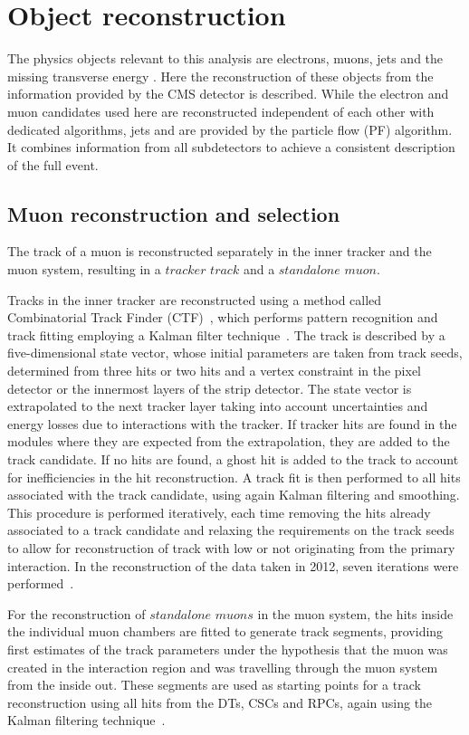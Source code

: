 \section{Object reconstruction}
The physics objects relevant to this analysis are electrons, muons, jets and the missing transverse energy \MET. Here the reconstruction of these objects from the information provided by the CMS detector is described. While the electron and muon candidates used here are reconstructed independent of each other with dedicated algorithms, jets and \MET are provided by the particle flow (PF) algorithm. It combines information from all subdetectors to achieve a consistent description of the full event. 
\subsection{Muon reconstruction and selection}
The track of a muon is reconstructed separately in the inner tracker and the muon system, resulting in a $\textit{tracker track}$ and a $\textit{standalone muon}$. 

Tracks in the inner tracker are reconstructed using a method called Combinatorial Track Finder (CTF)~\cite{Chatrchyan:2014fea}, which performs pattern recognition and track fitting employing a Kalman filter technique~\cite{Fruhwirth1987444}. The track is described by a five-dimensional state vector, whose initial parameters are taken from track seeds, determined from three hits or two hits and a vertex constraint in the pixel detector or the innermost layers of the strip detector. The state vector is extrapolated to the next tracker layer taking into account uncertainties and energy losses due to interactions with the tracker. If tracker hits are found in the modules where they are expected from the extrapolation, they are added to the track candidate. If no hits are found, a ghost hit is added to the track to account for inefficiencies in the hit reconstruction. A track fit is then performed to all hits associated with the track candidate, using again Kalman filtering and smoothing. This procedure is performed iteratively, each time removing the hits already associated to a track candidate and relaxing the requirements on the track seeds to allow for reconstruction of track with low \pt or not originating from the primary interaction. In the reconstruction of the data taken in 2012, seven iterations were performed~\cite{SWGuideIterativeTracking}. 

For the reconstruction of $\textit{standalone muons}$ in the muon system, the hits inside the individual muon chambers are fitted to generate track segments, providing first estimates of the track parameters under the hypothesis that the muon was created in the interaction region and was travelling through the muon system from the inside out. These segments are used as starting points for a track reconstruction using all hits from the DTs, CSCs and RPCs, again using the Kalman filtering technique~\cite{1748-0221-5-03-T03022}.

